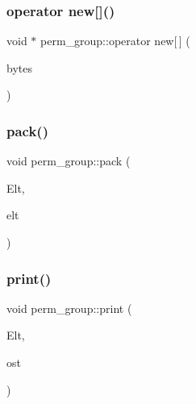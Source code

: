 \subsubsection{\texorpdfstring{operator new[]()}{operator new[]()}}
{\footnotesize\ttfamily void $\ast$ perm\+\_\+group\+::operator new\mbox{[}$\,$\mbox{]} (\begin{DoxyParamCaption}\item[{size\+\_\+t}]{bytes }\end{DoxyParamCaption})}

\mbox{\label{classperm__group_aa4595f87262bd95ed5656704c9cfa164}} 
\subsubsection{\texorpdfstring{pack()}{pack()}}
{\footnotesize\ttfamily void perm\+\_\+group\+::pack (\begin{DoxyParamCaption}\item[{\mbox{\hyperlink{galois_8h_a09fddde158a3a20bd2dcadb609de11dc}{I\+NT}} $\ast$}]{Elt,  }\item[{\mbox{\hyperlink{galois_8h_a122c4acf389c050379f00341fdcd5812}{U\+B\+Y\+TE}} $\ast$}]{elt }\end{DoxyParamCaption})}

\mbox{\label{classperm__group_af23c8538a48ea66019b7c5a4223b9bea}} 
\subsubsection{\texorpdfstring{print()}{print()}}
{\footnotesize\ttfamily void perm\+\_\+group\+::print (\begin{DoxyParamCaption}\item[{\mbox{\hyperlink{galois_8h_a09fddde158a3a20bd2dcadb609de11dc}{I\+NT}} $\ast$}]{Elt,  }\item[{ostream \&}]{ost }\end{DoxyParamCaption})}

\mbox{\label{classperm__group_a8f7f3f4f15f40c7f7fc366b2d6f5ce3f}} 
